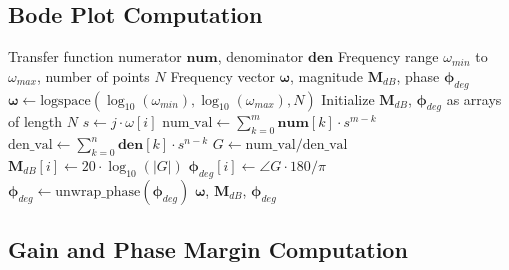 \subsection{Bode Plot Computation}
\label{subsec:bode_algorithm}

\begin{algorithm}[H]
\caption{Bode Plot Data Generation}
\label{alg:bode}
\begin{algorithmic}[1]
\REQUIRE Transfer function numerator $\mathbf{num}$, denominator $\mathbf{den}$
\REQUIRE Frequency range $\omega_{min}$ to $\omega_{max}$, number of points $N$
\ENSURE Frequency vector $\boldsymbol{\omega}$, magnitude $\mathbf{M}_{dB}$, phase $\boldsymbol{\phi}_{deg}$
\STATE
\STATE $\boldsymbol{\omega} \gets \text{logspace}(\log_{10}(\omega_{min}), \log_{10}(\omega_{max}), N)$
\STATE Initialize $\mathbf{M}_{dB}$, $\boldsymbol{\phi}_{deg}$ as arrays of length $N$
\STATE
{}
    \STATE $s \gets j \cdot \omega[i]$
    \STATE
    \STATE {}
    \STATE $\text{num\_val} \gets \sum_{k=0}^{m} \mathbf{num}[k] \cdot s^{m-k}$
    \STATE $\text{den\_val} \gets \sum_{k=0}^{n} \mathbf{den}[k] \cdot s^{n-k}$
    \STATE $G \gets \text{num\_val} / \text{den\_val}$
    \STATE
    \STATE {}
    \STATE $\mathbf{M}_{dB}[i] \gets 20 \cdot \log_{10}(|G|)$
    \STATE $\boldsymbol{\phi}_{deg}[i] \gets \angle G \cdot 180 / \pi$
\ENDFOR
\STATE
\STATE {}
\STATE $\boldsymbol{\phi}_{deg} \gets \text{unwrap\_phase}(\boldsymbol{\phi}_{deg})$
\STATE
\RETURN $\boldsymbol{\omega}$, $\mathbf{M}_{dB}$, $\boldsymbol{\phi}_{deg}$
\end{algorithmic}
\end{algorithm}

\subsection{Gain and Phase Margin Computation}
\label{subsec:margin_algorithm}

